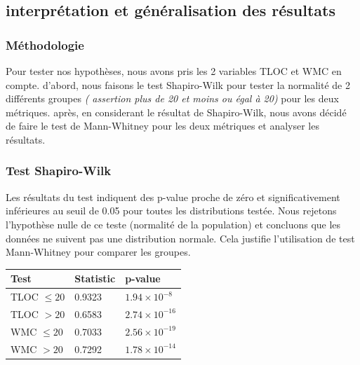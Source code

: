 \documentclass[10pt]{article}
\begin{document}
\subsection{ interprétation et généralisation des résultats}

\subsubsection{Méthodologie}
Pour tester nos hypothèses, nous avons pris les 2 variables TLOC et WMC en compte. d'abord, nous faisons le test Shapiro-Wilk pour tester la normalité de 2 différents groupes \textit{( assertion plus de 20 et moins ou égal à 20) }  pour les deux métriques. après, en considerant le résultat de Shapiro-Wilk, nous avons décidé de faire le test de Mann-Whitney pour les deux métriques et analyser les résultats.

\subsubsection{Test Shapiro-Wilk}

\noindent
\begin{minipage}[t]{0.5\textwidth}
\vspace{0pt}
Les résultats du test indiquent des p-value proche de zéro et significativement inférieures au seuil de 0.05 pour toutes les distributions testée. Nous rejetons l'hypothèse nulle de ce teste (normalité de la population) et concluons que les données ne suivent pas une distribution normale. Cela justifie l'utilisation de test Mann-Whitney pour comparer les groupes.
\end{minipage}
\hfill
\begin{minipage}[t]{0.45\textwidth}
\vspace{0pt}
\begin{tabular}{|l|l|l|}
\hline
\textbf{Test} & \textbf{Statistic} & \textbf{p-value} \\ \hline
TLOC $\leq20$ & 0.9323 & \( 1.94 \times 10^{-8} \) \\ \hline
TLOC $>20$ & 0.6583 & \( 2.74 \times 10^{-16} \) \\ \hline
WMC $\leq20$ & 0.7033 & \( 2.56 \times 10^{-19} \) \\ \hline
WMC $>20$ & 0.7292 & \( 1.78 \times 10^{-14} \) \\ \hline
\end{tabular}
\label{tab:shapiro_results}
\end{minipage}
\end{document}
